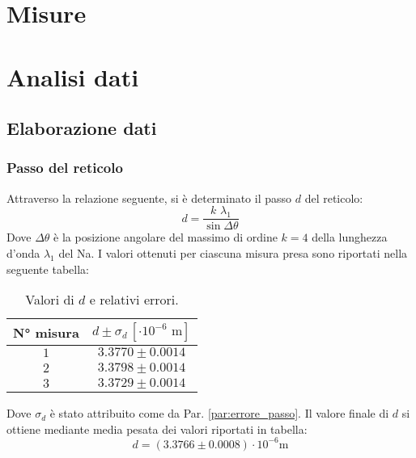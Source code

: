 \documentclass[]{article}
\let\oldsection\section%
\renewcommand{\section}{%
	\renewcommand{\theequation}{\thesection.\arabic{equation}}%
	\oldsection}%
\let\oldsubsection\subsection%
\renewcommand{\subsection}{%
	\renewcommand{\theequation}{\thesubsection.\arabic{equation}}%
	\oldsubsection}%
\begin{document}
    \section{Misure}

    \section{Analisi dati}
    \subsection{Elaborazione dati}
    \subsubsection{Passo del reticolo}
    Attraverso la relazione seguente, si è determinato il passo $d$ del reticolo: 
    \begin{equation}
        \label{passo}
        d = \frac{k \, \, \lambda_1}{\sin{\Delta\theta}}
    \end{equation}
    Dove $\Delta\theta$ è la posizione angolare del massimo di ordine $k=4$ della lunghezza d'onda $\lambda_1$ del Na.
    I valori ottenuti per ciascuna misura presa sono riportati nella seguente tabella:
    \begin{table} [H]
        \centering
        \begin{tabular}{||c|c||}
            \hline
            N° misura & $d \pm \sigma_d \, \left[\cdot 10^{-6}\text{ m}\right] $\\
            \hline \hline
            $ 1 $ & $ 3.3770 \pm 0.0014 $ \\\hline
            $ 2 $ & $ 3.3798 \pm 0.0014 $ \\\hline
            $ 3 $ & $ 3.3729 \pm 0.0014 $ \\\hline
        \end{tabular}
        \caption{Valori di $d$ e relativi errori.}
        \label{d-values}
    \end{table}
    Dove $\sigma_d$ è stato attribuito come da Par. \ref{par:errore_passo}.
    Il valore finale di $d$ si ottiene mediante media pesata dei valori riportati in tabella:
    \begin{equation}
        \label{d-value}
        d = (3.3766 \pm 0.0008 ) \cdot 10^{-6} \text{m}
    \end{equation}
\end{document}
